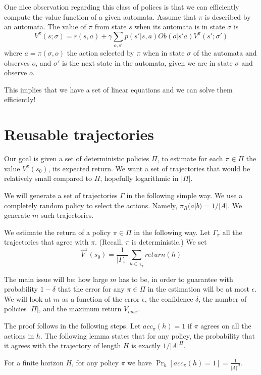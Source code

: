 One nice observation regarding this class of polices is that we can
efficiently compute the value function of a given automata. Assume
that $\pi$ is described by an automata. The value of $\pi$ from
state $s$ when its automata is in state $\sigma$ is
\[
V^\pi(s;\sigma)=r(s,a)+\gamma \sum_{o,s'}
p(s'|s,a)Ob(o|s'a)V^\pi(s';\sigma')
\]
where $a=\pi(\sigma,o)$ the action selected by $\pi$ when in state
$\sigma$ of the automata and observes $o$, and $\sigma'$ is the next
state in the automata, given we are in state $\sigma$ and observe
$o$.

This implies that we have a set of linear equations and we can solve
them efficiently!


\section{Reusable trajectories}

Our goal is given a set of deterministic policies $\Pi$, to estimate
for each $\pi\in \Pi$ the value $V^\pi(s_0)$, its expected return.
We want a set of trajectories that would be relatively small
compared to $\Pi$, hopefully logarithmic in $|\Pi|$.

We will generate a set of trajectories $\Gamma$ in the following
simple way. We use a completely random policy to select the actions.
Namely, $\pi_R(a|b)=1/|A|$. We generate $m$ such trajectories.

We estimate the return of a policy $\pi\in \Pi$ in the following
way. Let $\Gamma_\pi$ all the trajectories that agree with $\pi$.
(Recall, $\pi$ is deterministic.) We set
\[
\hat{V}^\pi(s_0)=\frac{1}{|\Gamma_\pi|}\sum_{h\in \gamma_\pi}
return(h)
\]

The main issue will be: how large $m$ has to be, in order to
guarantee with probability $1-\delta$ that the error for any $\pi\in
\Pi$ in the estimation will be at most $\epsilon$. We will look at
$m$ as a function of the error $\epsilon$, the confidence $\delta$,
the number of policies $|\Pi|$, and the maximum return $V_{max}$.

The proof follows in the following steps. Let $acc_\pi(h)=1$ if
$\pi$ agrees on all the actions in $h$. The following lemma states
that for any policy, the probability that it agrees with the
trajectory of length $H$ is exactly $1/|A|^H$.
\begin{lemma}
For a finite horizon $H$, for any policy $\pi$ we have
$\Pr_h[acc_\pi(h)=1]=\frac{1}{|A|^H}$.
\end{lemma}

